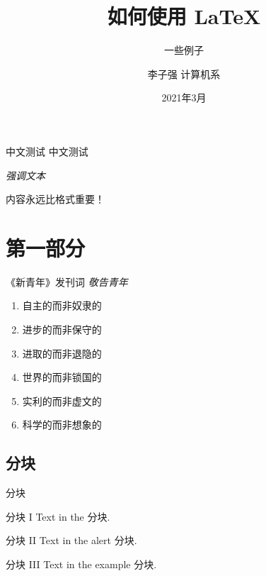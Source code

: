 \documentclass[compress, 10pt]{ctexbeamer}
\title[如何使用 \LaTeX]{\huge \textbf{ 如何使用 \LaTeX}}
\subtitle{一些例子}
\author{李子强 \enskip 计算机系}
\institute{\raggedleft 南方科技大学图书馆}
\date{2021年3月}
\begin{document}



{%
    \begin{frame}
    \maketitle
    \end{frame}%
}


\begin{frame}{中文测试}
    中文测试

    \emph{强调文本}

    \alert{内容永远比格式重要！}

\end{frame}


\section{第一部分}

\begin{frame}{《新青年》发刊词}
    \emph{敬告青年}
    \begin{enumerate}
        \item 自主的而非奴隶的
        \item 进步的而非保守的
        \item 进取的而非退隐的
        \item 世界的而非锁国的
        \item 实利的而非虚文的
        \item 科学的而非想象的
    \end{enumerate}

\end{frame}

\subsection{分块}
\begin{frame}{分块}
    \begin{block}{分块 I}
        Text in the 分块.
    \end{block}

    \begin{alertblock}{分块 II}
        Text in the alert 分块.
    \end{alertblock}

    \begin{exampleblock}{分块 III}
        Text in the example 分块.
    \end{exampleblock}
\end{frame}
\end{document}

